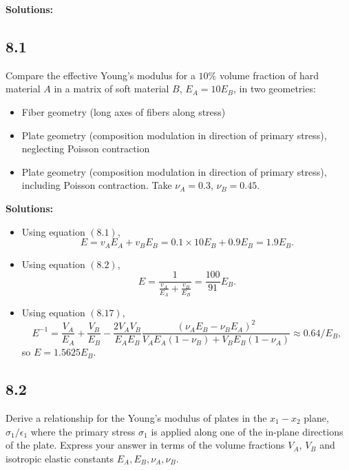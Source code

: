 \documentclass[12pt]{article}
\begin{document}
\textbf{Solutions:}

\subsection{8.1}
Compare the effective Young's modulus for a $10\%$ volume fraction of hard material $A$ in a matrix of soft material $B$, $E_A=10 E_B$, in two geometries:
\begin{itemize}
  \item Fiber geometry (long axes of fibers along stress)
  \item Plate geometry (composition modulation in direction of primary stress), neglecting Poisson contraction
  \item Plate geometry (composition modulation in direction of primary stress), including Poisson contraction. Take $\nu_A= 0.3$, $\nu_B= 0.45$.
\end{itemize}

\textbf{Solutions:}
\begin{itemize}
  \item Using equation $(8.1)$,
        \begin{equation}
          E = v_A E_A + v_B E_B = 0.1 \times 10 E_B + 0.9 E_B = 1.9 E_B.
        \end{equation}

  \item Using equation $(8.2)$,
        \begin{equation}
          E = \frac{ 1 }{ \frac{ v_A }{ E_A } + \frac{ v_B }{ E_B } }
          = \frac{ 100 }{ 91 } E_B.
        \end{equation}

  \item Using equation $(8.17)$,
        \begin{equation}
          E^{-1} = \frac{V_A}{E_A}+\frac{V_B}{E_B}- \frac{2 V_A V_B}{E_A E_B}\frac{\left(\nu_A E_B-\nu_B E_A\right)^2}{V_A E_A\left(1- \nu_B\right)+ V_B E_B\left(1 - \nu_A\right)}
          \approx 0.64 / E_B,
        \end{equation}
        so $E = 1.5625 E_B$.
\end{itemize}

\subsection{8.2}
Derive a relationship for the Young's modulus of plates in the $x_1 - x_2$ plane,
$\sigma_1/\epsilon_1$ where the primary stress $\sigma_1$ is applied along one of
the in-plane directions of the plate. Express your answer in terms of the volume
fractions $V_A$, $V_B$ and isotropic elastic constants $E_A, E_B, \nu_A, \nu_B$.
\end{document}
